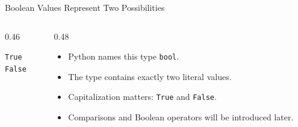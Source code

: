 \documentclass[aspectratio=169,10pt]{beamer}
\begin{document}
\begin{frame}{Boolean Values Represent Two Possibilities}

  \begin{columns}[T,onlytextwidth]

    \begin{column}{0.46\textwidth}

      \begin{center}

        {\Huge \texttt{True}}\\[0.28in]
        {\Huge \texttt{False}}

      \end{center}

    \end{column}

    \begin{column}{0.48\textwidth}

      \begin{itemize}

        \item Python names this type \texttt{bool}.

        \item The type contains exactly two literal values.

        \item Capitalization matters: \texttt{True} and \texttt{False}.

        \item Comparisons and Boolean operators will be introduced later.

      \end{itemize}

    \end{column}

  \end{columns}


\end{frame}
\end{document}
